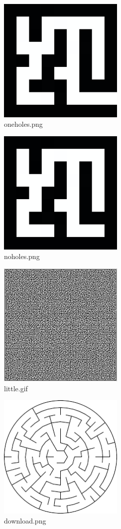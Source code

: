 \documentclass[titlepage]{article}
\begin{document}
\begin{figure}[H]
  \centering
  \includegraphics[width=6cm]{oneholes.png}
  \caption{oneholes.png}
  \label{fig:dijk}
\end{figure}

\begin{figure}[H]
  \centering
  \includegraphics[width=6cm]{noholes.png}
  \caption{noholes.png}
  \label{fig:dijk}
\end{figure}

\begin{figure}[H]
  \centering
  \includegraphics[width=6cm]{little.png}
  \caption{little.gif}
  \label{fig:dijk}
\end{figure}

\begin{figure}[H]
  \centering
  \includegraphics[width=6cm]{download.png}
  \caption{download.png}
  \label{fig:dijk}
\end{figure}
\end{document}
